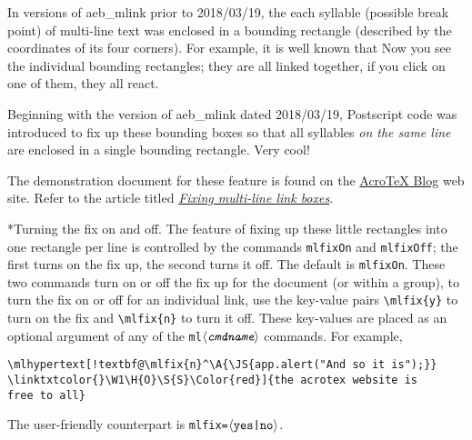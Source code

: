\documentclass{article}
\makeatletter
\edef\amtIndent{\the\parindent}
\def\AcroTeX{Acro\negthinspace\TeX}
\def\anglemeta#1{$\langle\textit{\texttt{#1}}\rangle$}
\let\ameta\anglemeta
\let\pkg\textsf
\def\cs#1{\texttt{\@backslashchar#1}}
\renewcommand{\paragraph}
    {\@startsection{paragraph}{4}{0pt}{6pt}{-3pt}{\bfseries}}
\makeatother
\begin{document}
In versions of \pkg{aeb\_mlink} prior to 2018/03/19, the each syllable
(possible break point) of multi-line text was enclosed in a bounding
rectangle (described by the coordinates of its four corners). For example, it
is well known that  Now you see the individual bounding
rectangles; they are all linked together, if you click on one of them, they
all react.

Beginning with the version of \pkg{aeb\_mlink} dated 2018/03/19, Postscript
code was introduced to fix up these bounding boxes so that all syllables
\emph{on the same line} are enclosed in a single bounding rectangle.
 Very cool!

 The demonstration document for these feature is found on the
\href{\urlAcroTeXBlog}{{\AcroTeX} Blog} web site. Refer to the article
titled \textsl{\href{\urlAcroTeXBlog?p=1377}{Fixing multi-line link boxes}}.


\paragraph*{Turning the fix on and off.} The feature of fixing up these
little rectangles into one rectangle per line is controlled by the commands
\cs{mlfixOn} and \cs{mlfixOff}; the first turns on the fix up, the second
turns it off. The default is \cs{mlfixOn}. These two commands turn on or off
the fix up for the document (or within a group), to turn the fix on or off
for an individual link, use the key-value pairs \verb~\mlfix{y}~ to turn on
the fix and \verb~\mlfix{n}~ to turn it off. These key-values are placed as
an optional argument of any of the \cs{ml\ameta{cmdname}} commands. For
example,
\begin{Verbatim}[xleftmargin=\amtIndent,fontsize=\small,commandchars={!@^}]
\mlhypertext[!textbf@\mlfix{n}^\A{\JS{app.alert("And so it is");}}
\linktxtcolor{}\W1\H{O}\S{S}\Color{red}]{the acrotex website is
free to all}
\end{Verbatim}
The user-friendly counterpart is \texttt{mlfix=\ameta{\upshape{yes|no}}}.
\end{document}

